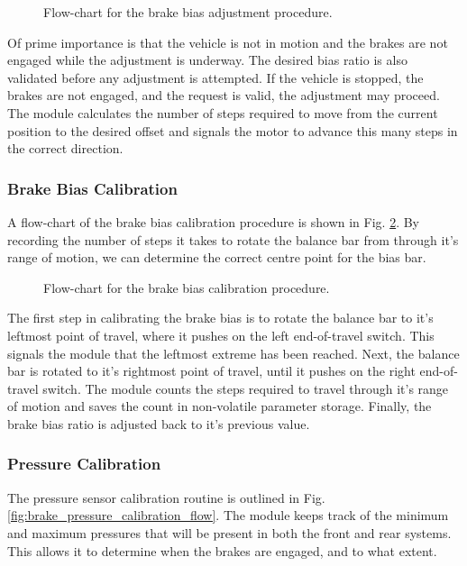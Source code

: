 \begin{figure}[H]
	\centering
	
	\caption{Flow-chart for the brake bias adjustment procedure.}
	\label{fig:design-braking-bias-adjustment}
\end{figure}

Of prime importance is that the vehicle is not in motion and the brakes are not engaged while the adjustment is underway. The desired bias ratio is also validated before any adjustment is attempted. If the vehicle is stopped, the brakes are not engaged, and the request is valid, the adjustment may proceed. The module calculates the number of steps required to move from the current position to the desired offset and signals the motor to advance this many steps in the correct direction.

\subsubsection{Brake Bias Calibration}

A flow-chart of the brake bias calibration procedure is shown in Fig. \ref{fig:brake_bias_calibration_flow}. By recording the number of steps it takes to rotate the balance bar from through it's range of motion, we can determine the correct centre point for the bias bar. 

\begin{figure}[H]
	\centering
	
	\caption{Flow-chart for the brake bias calibration procedure.}
	\label{fig:brake_bias_calibration_flow}
\end{figure}

The first step in calibrating the brake bias is to rotate the balance bar to it's leftmost point of travel, where it pushes on the left end-of-travel switch. This signals the module that the leftmost extreme has been reached. Next, the balance bar is rotated to it's rightmost point of travel, until it pushes on the right end-of-travel switch. The module counts the steps required to travel through it's range of motion and saves the count in non-volatile parameter storage. Finally, the brake bias ratio is adjusted back to it's previous value.

\subsubsection{Pressure Calibration}

The pressure sensor calibration routine is outlined in Fig. \ref{fig:brake_pressure_calibration_flow}. The module keeps track of the minimum and maximum pressures that will be present in both the front and rear systems. This allows it to determine when the brakes are engaged, and to what extent.

